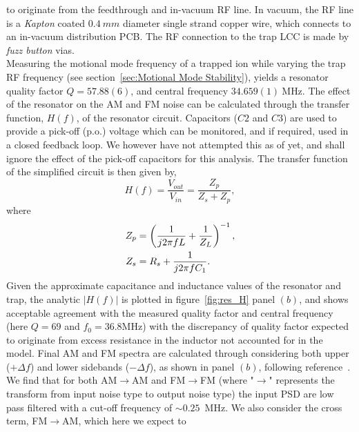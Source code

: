     to originate from the feedthrough and in-vacuum RF line. In vacuum, the RF line is a \emph{Kapton} coated $0.4~\unit{mm}$ diameter single strand copper wire, which connects to an in-vacuum distribution PCB. The RF connection to the trap LCC is made by \emph{fuzz button} vias.\\
    Measuring the motional mode frequency of a trapped ion while varying the trap RF frequency (see section~\ref{sec:Motional Mode Stability}), yields a resonator quality factor 
    $Q=57.88(6)$, and central
    frequency $34.659(1)~\unit{\mega\hertz}$.
    The effect of the resonator on the AM and FM noise can be calculated through
    the transfer function, $H(f)$, of the resonator circuit. 
    Capacitors ($C2$ and $C3$) are used to provide a pick-off (p.o.) voltage
    which can be monitored, and if required, used in a closed feedback loop. We
    however have not attempted this as of yet, and shall ignore the effect of
    the pick-off capacitors for this analysis. The transfer function of the simplified
    circuit is then given by,
    \begin{equation}
        H(f) = \frac{V_{out}}{V_{in}} = \frac{Z_p}{Z_s + Z_p},
    \end{equation}
    where
    \begin{equation}
        \begin{split}
            Z_p &= \Large\left(\frac{1}{j2\pi f L} + \frac{1}{Z_L}\Large\right)^{-1}, \\
            Z_s &= R_s + \frac{1}{j2\pi f C_1}.
        \end{split}
    \end{equation}
    Given the approximate capacitance and inductance values of the resonator and
    trap, the analytic $|H(f)|$ is plotted in figure~\ref{fig:res_H} panel
    $(b)$, and shows acceptable agreement with the measured quality factor and central
    frequency (here $Q = 69$ and $f_0=36.8\unit{\mega\hertz}$) with the discrepancy of quality factor expected to originate from excess resistance in the inductor not accounted for in the model. Final AM and FM
    spectra are calculated through considering both upper ($+\Delta f$) and
    lower sidebands ($-\Delta f$), as shown in panel $(b)$, following reference~\cite{danielson_am_2018}. We
    find that for both AM$\rightarrow$AM and FM$\rightarrow$FM (where
    "$\rightarrow$" represents the transform from input noise type to output
    noise type) the input PSD are
    low pass filtered with a cut-off frequency of $\sim 0.25$~MHz.
    We also consider the cross term, FM$\rightarrow$AM, which here we expect to

